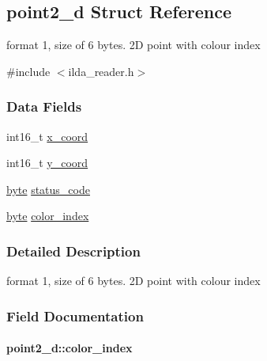 \hypertarget{structpoint2__d}{}\subsection{point2\+\_\+d Struct Reference}
\label{structpoint2__d}


format 1, size of 6 bytes. 2D point with colour index  




{\ttfamily \#include $<$ilda\+\_\+reader.\+h$>$}

\subsubsection*{Data Fields}
\begin{DoxyCompactItemize}
\item 
int16\+\_\+t \hyperlink{structpoint2__d_ace7ebdd2a9d9558104cbddcaf0cbd1ba}{x\+\_\+coord}
\item 
int16\+\_\+t \hyperlink{structpoint2__d_aee96b403bc3c20867009b8fcddac3399}{y\+\_\+coord}
\item 
\hyperlink{ilda__reader_8h_a0c8186d9b9b7880309c27230bbb5e69d}{byte} \hyperlink{structpoint2__d_ac4b500addb03876aad385716669899fd}{status\+\_\+code}
\item 
\hyperlink{ilda__reader_8h_a0c8186d9b9b7880309c27230bbb5e69d}{byte} \hyperlink{structpoint2__d_ac31c9a95ce5930655ad1de27d18bec2d}{color\+\_\+index}
\end{DoxyCompactItemize}


\subsubsection{Detailed Description}
format 1, size of 6 bytes. 2D point with colour index 

\subsubsection{Field Documentation}
\paragraph[{\texorpdfstring{color\+\_\+index}{color_index}}]{ point2\+\_\+d\+::color\+\_\+index}\hypertarget{structpoint2__d_ac31c9a95ce5930655ad1de27d18bec2d}{}\label{structpoint2__d_ac31c9a95ce5930655ad1de27d18bec2d}
